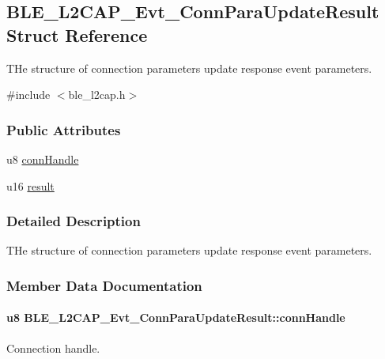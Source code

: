 \hypertarget{struct_b_l_e___l2_c_a_p___evt___conn_para_update_result}{}\subsection{B\+L\+E\+\_\+\+L2\+C\+A\+P\+\_\+\+Evt\+\_\+\+Conn\+Para\+Update\+Result Struct Reference}
\label{struct_b_l_e___l2_c_a_p___evt___conn_para_update_result}


T\+He structure of connection parameters update response event parameters.  




{\ttfamily \#include $<$ble\+\_\+l2cap.\+h$>$}

\subsubsection*{Public Attributes}
\begin{DoxyCompactItemize}
\item 
u8 \hyperlink{struct_b_l_e___l2_c_a_p___evt___conn_para_update_result_ae208193b263fe00c1f8a242d7681f3fe}{conn\+Handle}
\item 
u16 \hyperlink{struct_b_l_e___l2_c_a_p___evt___conn_para_update_result_a7151204dcf13ee49166b828e59ce1779}{result}
\end{DoxyCompactItemize}


\subsubsection{Detailed Description}
T\+He structure of connection parameters update response event parameters. 

\subsubsection{Member Data Documentation}
\paragraph[{\texorpdfstring{conn\+Handle}{connHandle}}]{\setlength{\rightskip}{0pt plus 5cm}u8 B\+L\+E\+\_\+\+L2\+C\+A\+P\+\_\+\+Evt\+\_\+\+Conn\+Para\+Update\+Result\+::conn\+Handle}\hypertarget{struct_b_l_e___l2_c_a_p___evt___conn_para_update_result_ae208193b263fe00c1f8a242d7681f3fe}{}\label{struct_b_l_e___l2_c_a_p___evt___conn_para_update_result_ae208193b263fe00c1f8a242d7681f3fe}
Connection handle. 
